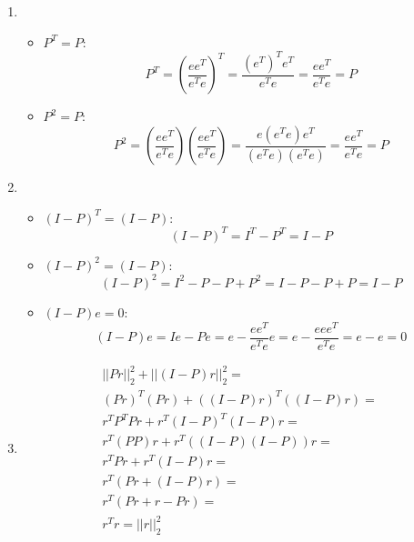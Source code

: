 \documentclass[a4paper]{article}
\begin{document}
      \begin{enumerate}[label=(\alph*)]
         \item
            \begin{itemize}
               \item
                  $P^{T} = P$:
                  \[
                     P^{T} =
                     (\frac{e e^{T}}{e^{T} e})^{T} =
                     \frac{(e^{T})^{T} e^{T}}{e^{T} e} =
                     \frac{e e^{T}}{e^{T} e} =
                     P
                  \]

               \item
                  $P^{2} = P$:
                  \[
                     P^{2} =
                     (\frac{e e^{T}}{e^{T} e}) (\frac{e e^{T}}{e^{T} e}) =
                     \frac{e (e^{T} e) e^{T}}{(e^{T} e)(e^{T} e)} =
                     \frac{e e^{T}}{e^{T} e} =
                     P
                  \]
            \end{itemize}

         \item
            \begin{itemize}
               \item
                  $(I - P)^{T} = (I - P)$:
                  \[
                     (I - P)^{T} =
                     I^{T} - P^{T} =
                     I - P
                  \]

               \item
                  $(I - P)^{2} = (I - P)$:
                  \[
                     (I - P)^{2} =
                     I^{2} - P - P + P^{2} =
                     I - P - P + P =
                     I - P
                  \]

               \item
                  $(I - P) e = 0$:
                  \[
                     (I - P) e =
                     I e - P e =
                     e - \frac{e e^{T}}{e^{T} e} e =
                     e - \frac{e e e^{T}}{e^{T} e} =
                     e - e =
                     0
                  \]
            \end{itemize}

         \item
            \begin{gather*}
               ||P r||_{2}^{2} + ||(I - P) r||_{2}^{2} = \\
               (P r)^{T} (P r) + ((I - P) r)^{T} ((I - P) r) = \\
               r^{T} P^{T} P r + r^{T} (I - P)^{T} (I - P) r = \\
               r^{T} (P P) r + r^{T} ((I - P) (I - P)) r = \\
               r^{T} P r + r^{T} (I - P) r = \\
               r^{T} (P r + (I -P) r) = \\
               r^{T} (P r + r - P r) = \\
               r^{T} r =
               ||r||_{2}^{2}
            \end{gather*}


\end{enumerate}
\end{document}
